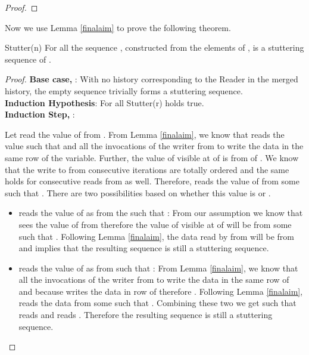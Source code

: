 \begin{description}
\begin{proof}
\end{proof}
   
Now we use Lemma \ref{finalaim} to prove the following theorem.
\begin{theorem}
Stutter(n) For all  the sequence
, constructed from the elements of , is a stuttering sequence of .
\end{theorem}
\begin{proof}
 \textbf{Base case, }: With no history corresponding to the Reader in the merged history, the empty sequence trivially forms a stuttering sequence.\\
 \textbf{Induction Hypothesis}: For all  Stutter(r) holds true.\\
 \textbf{Induction Step, }: 


Let  read the value of  from .
From Lemma \ref{finalaim}, we know that 
reads the value  such that  and all the invocations of the writer from  to  write the data in the same row  of the  variable.
Further, the value of  visible at  of  is from  of . We know that the write to  from consecutive iterations are totally ordered and 
the same holds for consecutive reads from  as well.  
Therefore,  reads the value of  from some  such that . There are two possibilities based on whether this value is  or .
\begin{itemize}
\item  reads the value of  as  from the  such that : From our assumption we know that  sees the value of  from 
 therefore the value of  visible at  of  will be from some  such that . 
Following Lemma \ref{finalaim},  the data read by 
 from  will be from  and  implies that the resulting sequence  is still a stuttering sequence.

\item   reads the value of  as  from  such that : From Lemma \ref{finalaim}, we know that all the invocations of the writer from 
 to  write the data in the same row  of  and because  writes the data in row  of  therefore . Following Lemma \ref{finalaim},  reads the data from some  such that . Combining these two we get  such that  reads  and  reads . Therefore the 
resulting sequence  is still a stuttering sequence.
\end{itemize}



\end{proof}



\end{description}
